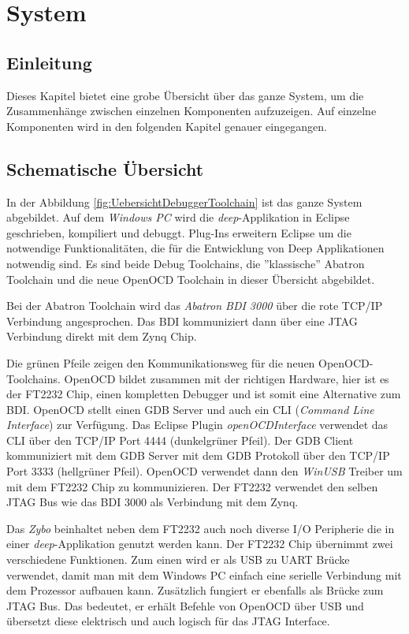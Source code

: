 \chapter{System}
\section{Einleitung}
Dieses Kapitel bietet eine grobe Übersicht über das ganze System, um die Zusammenhänge zwischen einzelnen Komponenten aufzuzeigen.
Auf einzelne Komponenten wird in den folgenden Kapitel genauer eingegangen.

\section{Schematische Übersicht}
In der Abbildung \ref{fig:UebersichtDebuggerToolchain} ist das ganze System abgebildet.
Auf dem \textit{Windows PC} wird die \textit{deep}-Applikation in Eclipse geschrieben, kompiliert und debuggt.
Plug-Ins erweitern Eclipse um die notwendige Funktionalitäten, die für die Entwicklung von Deep Applikationen notwendig sind.
Es sind beide Debug Toolchains, die ''klassische'' Abatron Toolchain und die neue OpenOCD Toolchain in dieser Übersicht abgebildet.

Bei der Abatron Toolchain wird das \textit{Abatron BDI 3000} über die rote TCP/IP Verbindung angesprochen.
Das BDI kommuniziert dann über eine JTAG Verbindung direkt mit dem Zynq Chip.

Die grünen Pfeile zeigen den Kommunikationsweg für die neuen OpenOCD-Toolchains.
OpenOCD bildet zusammen mit der richtigen Hardware, hier ist es der FT2232 Chip, einen kompletten Debugger und ist somit eine Alternative zum BDI.
OpenOCD stellt einen GDB Server und auch ein CLI (\textit{Command Line Interface}) zur Verfügung.
Das Eclipse Plugin \textit{openOCDInterface} verwendet das CLI über den TCP/IP Port 4444 (dunkelgrüner Pfeil).
Der GDB Client kommuniziert mit dem GDB Server mit dem GDB Protokoll über den TCP/IP Port 3333 (hellgrüner Pfeil).
OpenOCD verwendet dann den \textit{WinUSB} Treiber um mit dem FT2232 Chip zu kommunizieren.
Der FT2232 verwendet den selben JTAG Bus wie das BDI 3000 als Verbindung mit dem Zynq.

Das \textit{Zybo} beinhaltet neben dem FT2232 auch noch diverse I/O Peripherie die in einer \textit{deep}-Applikation genutzt werden kann.
Der FT2232 Chip übernimmt zwei verschiedene Funktionen.
Zum einen wird er als USB zu UART Brücke verwendet, damit man mit dem Windows PC einfach eine serielle Verbindung mit dem Prozessor aufbauen kann.
Zusätzlich fungiert er ebenfalls als Brücke zum JTAG Bus.
Das bedeutet, er erhält Befehle von OpenOCD über USB und übersetzt diese elektrisch und auch logisch für das JTAG Interface.

